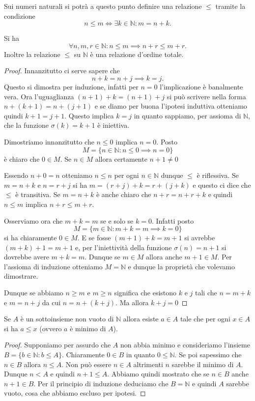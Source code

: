 \documentclass[italian,a4paper,twosides,headinclude]{scrbook}
\newcommand{\NN}{\mathbb N}
\begin{document}
Sui numeri naturali
si potrà a questo punto definire una relazione $\le$ tramite la condizione
\[
  n \le m \iff \exists k \in \NN \colon m = n+k.
\]

\begin{theorem}
Si ha
\[
 \forall n,m,r\in \NN \colon n\le m \implies n+r \le m+r.
\]
Inoltre
la relazione $\le$ su $\NN$ è una relazione d'ordine totale.
\end{theorem}
\begin{proof}
Innanzitutto ci serve sapere che
\[
n + k = n + j \implies k=j.
\]
Questo si dimostra per induzione, infatti per $n=0$ l'implicazione è
banalmente vera. Ora l'uguaglianza $(n+1) + k = (n+1) + j$
si può scrivere nella forma $n+(k+1) = n + (j+1)$ e se diamo per buona
l'ipotesi induttiva otteniamo quindi $k+1 = j+1$.
Questo implica $k=j$ in quanto sappiamo, per assioma di $\NN$, che la funzione
$\sigma(k) = k+1$ è iniettiva.

Dimostriamo innanzitutto che $n\le 0$ implica $n=0$. Posto
\[
  M = \{ n \in \NN \colon n\le 0 \implies n=0\}
\]
è chiaro che $0\in M$. Se $n\in M$ allora certamente $n+1\neq 0$

Essendo $n+0=n$ otteniamo $n\le n$ per ogni $n\in \NN$ dunque $\le$ è riflessiva.
Se $m=n+k$ e $n=r+j$ si ha $m=(r+j)+k = r+(j+k)$ e questo ci dice che $\le$ è transitiva.
Se $m=n+k$ è anche chiaro che $n+r=n+r+k$ e quindi $n\le m$ implica $n+r\le m+r$.

Osserviamo ora che $m+k = m$ se e solo se $k=0$. Infatti posto
\[
M=\{m\in \NN\colon m+k = m \implies k=0 \}
\]
si ha chiaramente $0\in M$. E se fosse $(m+1)+k=m+1$ si avrebbe $(m+k)+1=m+1$ e,
per l'iniettività della funzione $\sigma(n)=n+1$ si dovrebbe avere $m+k=m$.
Dunque se $m\in M$ allora anche $m+1\in M$. Per l'assioma di induzione otteniamo
$M=\NN$ e dunque la proprietà che volevamo dimostrare.

Dunque se abbiamo $n\ge m$ e $m\ge n$ significa che esistono $k$ e $j$
tali che $n=m+k$ e $m=n+j$ da cui $n=n+(k+j)$. Ma allora $k+j=0$
\end{proof}

\begin{theorem}[buon ordinamento di $\NN$]
Se $A$ è un sottoinsieme non vuoto di $\NN$ allora esiste $a \in A$
tale che per ogni $x\in A$ si ha $a\le x$ (ovvero $a$ è minimo di $A$).
\end{theorem}
%
\begin{proof}
Supponiamo per assurdo che $A$ non abbia minimo e consideriamo l'insieme
$B=\{b\in \NN\colon b \le A\}$.
Chiaramente $0\in B$ in quanto $0\le \NN$. Se poi sapessimo che $n\in B$
allora $n\le A$. Non può essere $n\in A$ altrimenti $n$ sarebbe il minimo di $A$. Dunque $n < A$ e quindi $n+1 \le A$. Abbiamo quindi mostrato che se $n\in B$ anche $n+1\in B$. Per il principio di induzione deduciamo che $B=\NN$ e quindi $A$ sarebbe vuoto, cosa che abbiamo escluso per ipotesi.
\end{proof}
\end{document}
